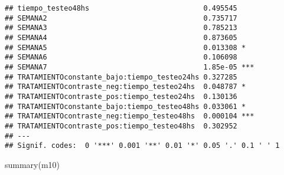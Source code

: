 \documentclass[
]{article}
\newenvironment{Shaded}{\begin{snugshade}}{\end{snugshade}}
\newcommand{\FunctionTok}[1]{\textcolor[rgb]{0.00,0.00,0.00}{#1}}
\newcommand{\NormalTok}[1]{#1}
\begin{document}
\begin{verbatim}
## tiempo_testeo48hs                           0.495545    
## SEMANA2                                     0.735717    
## SEMANA3                                     0.785213    
## SEMANA4                                     0.873605    
## SEMANA5                                     0.013308 *  
## SEMANA6                                     0.106098    
## SEMANA7                                     1.85e-05 ***
## TRATAMIENTOconstante_bajo:tiempo_testeo24hs 0.327285    
## TRATAMIENTOcontraste_neg:tiempo_testeo24hs  0.048787 *  
## TRATAMIENTOcontraste_pos:tiempo_testeo24hs  0.130136    
## TRATAMIENTOconstante_bajo:tiempo_testeo48hs 0.033061 *  
## TRATAMIENTOcontraste_neg:tiempo_testeo48hs  0.000104 ***
## TRATAMIENTOcontraste_pos:tiempo_testeo48hs  0.302952    
## ---
## Signif. codes:  0 '***' 0.001 '**' 0.01 '*' 0.05 '.' 0.1 ' ' 1
\end{verbatim}

\begin{Shaded}
\begin{Highlighting}[]
\FunctionTok{summary}\NormalTok{(m10)}
\end{Highlighting}
\end{Shaded}
\end{document}
